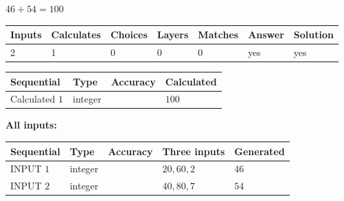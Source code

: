 \documentclass[12pt]{article}
\begin{document}
 
\noindent{}
 
 

$ %
46 +  %
54=   %
100$
 
 
\noindent{}
 
 

 
   
   
   
   
\noindent\begin{tabular}{|l|l|l|l|l|l|l|}
 \hline
Inputs & Calculates & Choices & Layers & Matches & Answer & Solution \\ \hline
 2  & 
 1  & 
 0
  & 
 0  & 
 0  & 
  yes & 
  yes 
  \\ \hline
 \end{tabular}
   
   
   
   
\noindent{}
   
   
  
  
\noindent\begin{tabular}{|l|l|l|l|}
\hline
 Sequential & Type & Accuracy & Calculated \\ 
\hline
 
 
  Calculated $  1 $ & integer &  & 
  $ 100 $ 
 \\  \hline  
 \end{tabular}
   
   
   
   
\noindent\vspace{0.1in}\hspace{-0.08in} {\textbf{\Large{All inputs: }}}
   
   
  
  
\noindent\begin{tabular}{|l|l|l|l|l|}
\hline
 Sequential & Type & Accuracy & Three inputs & Generated \\ 
\hline
 
 
  INPUT $  1 $ & integer &  & $
 20
 , 
 60
 , 
 2
 $ & $ 46 $ 
 \\  \hline  
 
 
  INPUT $  2 $ & integer &  & $
 40
 , 
 80
 , 
 7
 $ & $ 54 $ 
 \\  \hline  
 \end{tabular}
   
   
  
\end{document}
